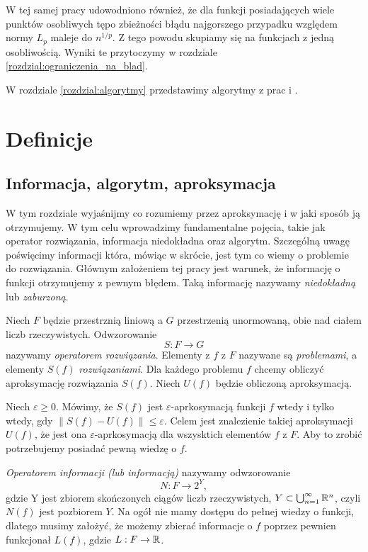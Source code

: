 \documentclass[oik, pdftex, robocza, man]{mgrwms}
\begin{document}
\begin{wstep}[Wprowadzenie]
    W tej samej pracy udowodniono również, że dla funkcji posiadających wiele punktów osobliwych tępo zbieżności błądu najgorszego przypadku względem normy $L_{p}$ maleje do $n^{1/p}$. Z tego powodu skupiamy się na funkcjach z jedną osobliwością. Wyniki te przytoczymy w rozdziale \ref{rozdzial:ograniczenia_na_blad}.

    W rozdziale \ref{rozdzial:algorytmy} przedstawimy algorytmy z prac \cite{AoP} i \cite{CoDF}.

\end{wstep}


\chapter{Definicje}


\section{Informacja, algorytm, aproksymacja}


    W tym rozdziale wyjaśnijmy co rozumiemy przez aproksymację i w jaki sposób ją otrzymujemy. W tym celu wprowadzimy fundamentalne pojęcia, takie jak operator rozwiązania, informacja niedokładna oraz algorytm. Szczególną uwagę poświęcimy informacji która, mówiąc w skrócie, jest tym co wiemy o problemie do rozwiązania. Głównym założeniem tej pracy jest warunek, że informację o funkcji otrzymujemy z pewnym błędem. Taką informację nazywamy \textit{niedokładną} lub \textit{zaburzoną}.

    Niech $F$ będzie przestrznią liniową a $G$ przestrzenią unormowaną, obie nad ciałem liczb rzeczywistych. Odwzorowanie 
    \begin{equation*}
        S : F \rightarrow G
    \end{equation*}
    nazywamy \textit{operatorem rozwiązania}. Elementy z $f$ z $F$ nazywane są \textit{problemami}, a elementy $S(f)$ \textit{rozwiązaniami}. Dla każdego problemu $f$ chcemy obliczyć aproksymację rozwiązania $S(f)$. Niech $U(f)$ będzie obliczoną aproksymacją.

    Niech $\varepsilon \geq 0$. Mówimy, że $S(f)$ jest $\varepsilon$-aprkosymacją funkcji $f$ wtedy i tylko wtedy, gdy $\| S(f) -  U(f)\| \leq \varepsilon$. Celem jest znalezienie takiej aproksymacji $U(f)$, że jest ona $\varepsilon$-aprkosymacją dla wszysktich elementów $f$ z $F$. Aby to zrobić potrzebujemy posiadać pewną wiedzę o $f$.

    \textit{Operatorem informacji (lub informacją)} nazywamy odwzorowanie
    \begin{equation*}
        N : F \rightarrow 2^{Y},
    \end{equation*}
    gdzie Y jest zbiorem skończonych ciągów liczb rzeczywistych, $ Y \subset \bigcup^{\infty}_{n=1} \mathbb{R}^{n}$, czyli $N(f)$ jest pozbiorem $Y$.
    Na ogół nie mamy dostępu do pełnej wiedzy o funkcji, dlatego musimy założyć, że możemy zbierać informacje o $f$ poprzez pewnien funkcjonał $L(f)$, gdzie $L : F \rightarrow \mathbb{R}$.
    
\end{document}
